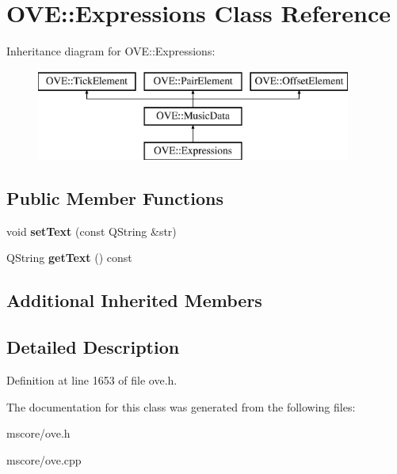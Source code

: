 \hypertarget{class_o_v_e_1_1_expressions}{}\section{O\+VE\+:\+:Expressions Class Reference}
\label{class_o_v_e_1_1_expressions}
Inheritance diagram for O\+VE\+:\+:Expressions\+:\begin{figure}[H]
\begin{center}
\leavevmode
\includegraphics[height=3.000000cm]{class_o_v_e_1_1_expressions}
\end{center}
\end{figure}
\subsection*{Public Member Functions}
\begin{DoxyCompactItemize}
\item 
\mbox{\label{class_o_v_e_1_1_expressions_a5c08f341a0272168d4b018a616c6dc9b}} 
void {\bfseries set\+Text} (const Q\+String \&str)
\item 
\mbox{\label{class_o_v_e_1_1_expressions_a85d8249f0efc00556f248c49dbb59f86}} 
Q\+String {\bfseries get\+Text} () const
\end{DoxyCompactItemize}
\subsection*{Additional Inherited Members}


\subsection{Detailed Description}


Definition at line 1653 of file ove.\+h.



The documentation for this class was generated from the following files\+:\begin{DoxyCompactItemize}
\item 
mscore/ove.\+h\item 
mscore/ove.\+cpp\end{DoxyCompactItemize}
